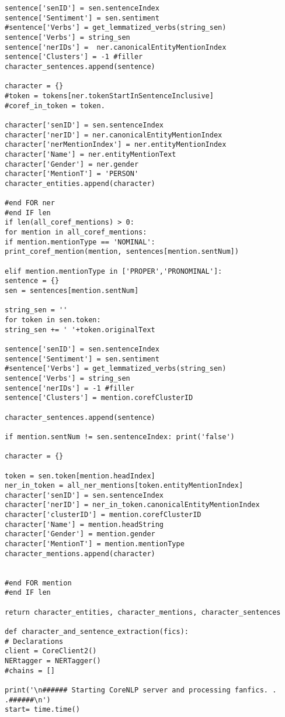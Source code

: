 \documentclass{pre-tfg}
\begin{document}
\begin{lstlisting}[style=consola]
sentence['senID'] = sen.sentenceIndex
sentence['Sentiment'] = sen.sentiment
#sentence['Verbs'] = get_lemmatized_verbs(string_sen)
sentence['Verbs'] = string_sen
sentence['nerIDs'] =  ner.canonicalEntityMentionIndex
sentence['Clusters'] = -1 #filler
character_sentences.append(sentence)

character = {}
#token = tokens[ner.tokenStartInSentenceInclusive]
#coref_in_token = token.

character['senID'] = sen.sentenceIndex
character['nerID'] = ner.canonicalEntityMentionIndex
character['nerMentionIndex'] = ner.entityMentionIndex
character['Name'] = ner.entityMentionText
character['Gender'] = ner.gender
character['MentionT'] = 'PERSON'
character_entities.append(character)

#end FOR ner
#end IF len
if len(all_coref_mentions) > 0:
for mention in all_coref_mentions:
if mention.mentionType == 'NOMINAL':
print_coref_mention(mention, sentences[mention.sentNum])

elif mention.mentionType in ['PROPER','PRONOMINAL']:
sentence = {}
sen = sentences[mention.sentNum]

string_sen = ''
for token in sen.token: 
string_sen += ' '+token.originalText

sentence['senID'] = sen.sentenceIndex
sentence['Sentiment'] = sen.sentiment
#sentence['Verbs'] = get_lemmatized_verbs(string_sen)
sentence['Verbs'] = string_sen
sentence['nerIDs'] = -1 #filler
sentence['Clusters'] = mention.corefClusterID

character_sentences.append(sentence)

if mention.sentNum != sen.sentenceIndex: print('false')

character = {}

token = sen.token[mention.headIndex]
ner_in_token = all_ner_mentions[token.entityMentionIndex]
character['senID'] = sen.sentenceIndex
character['nerID'] = ner_in_token.canonicalEntityMentionIndex
character['clusterID'] = mention.corefClusterID
character['Name'] = mention.headString
character['Gender'] = mention.gender
character['MentionT'] = mention.mentionType
character_mentions.append(character)


#end FOR mention
#end IF len		

return character_entities, character_mentions, character_sentences

def character_and_sentence_extraction(fics):
# Declarations
client = CoreClient2()
NERtagger = NERTagger()
#chains = []

print('\n###### Starting CoreNLP server and processing fanfics. . .######\n')
start= time.time()



\end{lstlisting}
\end{document}
